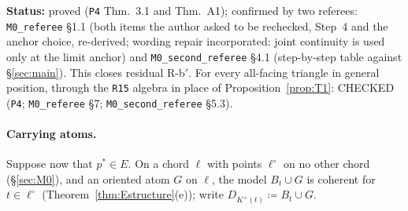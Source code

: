 \documentclass[11pt]{article}
\theoremstyle{definition}
\theoremstyle{remark}
\newcommand{\src}[1]{\texttt{#1}}
\newcommand{\status}[1]{\par\smallskip\noindent\textbf{Status:} #1\par\smallskip}
\begin{document}
\status{proved (\src{P4} Thm.~3.1 and Thm.~A1); confirmed by two referees: \src{M0\_referee} \S1.1 (both items the author asked to be rechecked, Step~4 and the anchor choice, re-derived; wording repair incorporated: joint continuity is used only at the limit anchor) and \src{M0\_second\_referee} \S4.1 (step-by-step table against \S\ref{sec:main}). This closes residual R-b$'$. For every all-facing triangle in general position, through the \src{R15} algebra in place of Proposition~\ref{prop:T1}: CHECKED (\src{P4}; \src{M0\_referee} \S7; \src{M0\_second\_referee} \S5.3).}

\paragraph{Carrying atoms.} Suppose now that $p^*\in E$. On a chord $\ell$ with points $\ell^\circ$ on no other chord (\S\ref{sec:M0}), and an oriented atom $G$ on $\ell$, the model $B_t\cup G$ is coherent for $t\in\ell^\circ$ (Theorem~\ref{thm:Estructure}(e)); write $D_{K^+(t)}\coloneqq B_t\cup G$.
\end{document}

